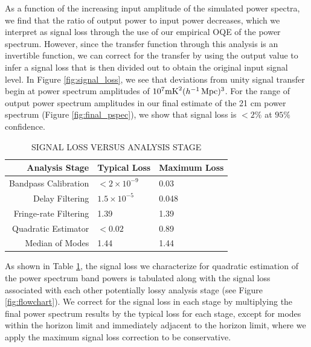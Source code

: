 \documentclass[twocolumn,numberedappendix]{emulateapj} \shorttitle{PSA64}
\begin{document}
As a function of the increasing input amplitude of the simulated power spectra,
we find that the ratio of output power to input power decreases, which we interpret
 as signal loss through the use of our empirical OQE of the power spectrum.  
However, since the transfer function through this analysis is an invertible function,
we can correct for the transfer by using the output value to infer a signal loss
that is then divided out to obtain the original input signal level.  In Figure \ref{fig:signal_loss},
we see that
deviations from unity signal transfer begin at
power spectrum amplitudes of $10^{7} \text{mK}^{2} (h^{-1}\rm
\,\text{Mpc})^{3}$. For the range of output power spectrum amplitudes in our
final estimate of the 21 cm power spectrum (Figure \ref{fig:final_pspec}), we
show that signal loss is $<2\%$ at $95\%$ confidence. 

\begin{table}[htdp]
\caption{SIGNAL LOSS VERSUS ANALYSIS STAGE}
\begin{center}
\begin{tabular}{rll}
Analysis Stage & Typical Loss & Maximum Loss \\
\hline
Bandpass Calibration &  $< 2 \times 10^{-9}$ & 0.03 \\
Delay Filtering & $1.5\times10^{-5}$ & 0.048 \\
Fringe-rate Filtering & 1.39 & 1.39 \\
Quadratic Estimator & $<0.02$ & 0.89 \\
Median of Modes & 1.44 & 1.44 \\
\end{tabular}
\end{center}
\label{tbl:sigloss}
\end{table}%

As shown in Table \ref{tbl:sigloss}, the signal loss we characterize for quadratic
estimation of the power spectrum band powers is tabulated along with the signal
loss associated with each other potentially lossy analysis stage (see Figure \ref{fig:flowchart}).
We correct for the signal loss in each stage by multiplying the final power spectrum results
by the typical loss for each stage, except for modes within the horizon limit and immediately
adjacent to the horizon limit, where we apply the maximum signal loss correction to be conservative.

\end{document}
